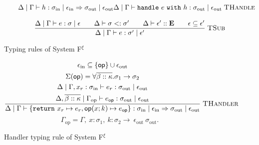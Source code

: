 \begin{figure}[p]
\begin{gather*}
{              \qquad
              \Delta \mid \Gamma\vdash h:
              \sigma_{\mathrm{in}}\mid\epsilon_{\mathrm{in}}
              \Rightarrow\sigma_{\mathrm{out}}\mid\epsilon_{\mathrm{out}}}
             {\Delta \mid \Gamma\vdash
              \texttt{handle}~e~\texttt{with}~h:
              \sigma_{\mathrm{out}}\mid\epsilon_{\mathrm{out}}}
             \;\textsc{THandle}
        \\[8pt]
        \frac{\Delta \mid \Gamma\vdash e:\sigma\mid\epsilon
              \qquad\Delta\vdash\sigma<:\sigma'
              \qquad\Delta\vdash\epsilon'::\mathbf{E}
              \qquad\epsilon\subseteq\epsilon'}
             {\Delta \mid \Gamma\vdash e:\sigma'\mid\epsilon'}
             \;\textsc{TSub}
    \end{gather*}

    \caption{Typing rules of System F$^{\xi}$}
    \label{systemf:typing-rules}
\end{figure}

\begin{figure}[p]
    \small
    \noindent{}

    \medskip
    \begin{gather*}
        \frac{
          \begin{gathered}
          \epsilon_{\mathrm{in}}\subseteq
             \{\mathsf{op}\}\cup\epsilon_{\mathrm{out}}\\
          \Sigma(\mathsf{op})=
             \forall\overline{\beta::\kappa}.\sigma_1\to\sigma_2\\
          \Delta \mid \Gamma,x_r:\sigma_{\mathrm{in}}
             \vdash e_r:\sigma_{\mathrm{out}}\mid\epsilon_{\mathrm{out}}\\
          \Delta,\overline{\beta::\kappa} \mid \Gamma_{\mathrm{op}}
             \vdash e_{\mathsf{op}}:
             \sigma_{\mathrm{out}}\mid\epsilon_{\mathrm{out}}
          \end{gathered}}
             {\Delta \mid \Gamma\vdash
              \{\texttt{return}~x_r\mapsto e_r,
                \mathsf{op}(x;k)\mapsto e_{\mathsf{op}}\}:
              \sigma_{\mathrm{in}}\mid\epsilon_{\mathrm{in}}
              \Rightarrow\sigma_{\mathrm{out}}\mid\epsilon_{\mathrm{out}}}
             \;\textsc{THandler}
    \end{gather*}
    \[
       \Gamma_{\mathrm{op}}=\Gamma,\ x:\sigma_1,\
          k:\sigma_2\rightarrow~\epsilon_{\mathrm{out}}~
          \sigma_{\mathrm{out}}.
    \]

    \caption{Handler typing rule of System F$^{\xi}$}
    \label{systemf:handler-typing-rules}
\end{figure}

